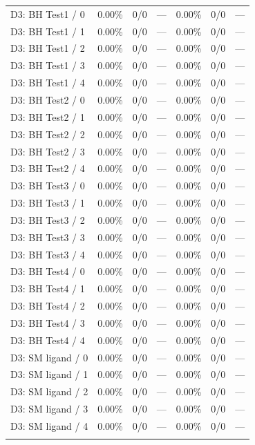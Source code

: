 \begin{longtable}{@{}lrrrrrr@{}}
\addlinespace
D3: BH Test1 / 0 & 0.00\% & 0/0 & --- & 0.00\% & 0/0 & --- \\
D3: BH Test1 / 1 & 0.00\% & 0/0 & --- & 0.00\% & 0/0 & --- \\
D3: BH Test1 / 2 & 0.00\% & 0/0 & --- & 0.00\% & 0/0 & --- \\
D3: BH Test1 / 3 & 0.00\% & 0/0 & --- & 0.00\% & 0/0 & --- \\
D3: BH Test1 / 4 & 0.00\% & 0/0 & --- & 0.00\% & 0/0 & --- \\
\addlinespace
D3: BH Test2 / 0 & 0.00\% & 0/0 & --- & 0.00\% & 0/0 & --- \\
D3: BH Test2 / 1 & 0.00\% & 0/0 & --- & 0.00\% & 0/0 & --- \\
D3: BH Test2 / 2 & 0.00\% & 0/0 & --- & 0.00\% & 0/0 & --- \\
D3: BH Test2 / 3 & 0.00\% & 0/0 & --- & 0.00\% & 0/0 & --- \\
D3: BH Test2 / 4 & 0.00\% & 0/0 & --- & 0.00\% & 0/0 & --- \\
\addlinespace
D3: BH Test3 / 0 & 0.00\% & 0/0 & --- & 0.00\% & 0/0 & --- \\
D3: BH Test3 / 1 & 0.00\% & 0/0 & --- & 0.00\% & 0/0 & --- \\
D3: BH Test3 / 2 & 0.00\% & 0/0 & --- & 0.00\% & 0/0 & --- \\
D3: BH Test3 / 3 & 0.00\% & 0/0 & --- & 0.00\% & 0/0 & --- \\
D3: BH Test3 / 4 & 0.00\% & 0/0 & --- & 0.00\% & 0/0 & --- \\
\addlinespace
D3: BH Test4 / 0 & 0.00\% & 0/0 & --- & 0.00\% & 0/0 & --- \\
D3: BH Test4 / 1 & 0.00\% & 0/0 & --- & 0.00\% & 0/0 & --- \\
D3: BH Test4 / 2 & 0.00\% & 0/0 & --- & 0.00\% & 0/0 & --- \\
D3: BH Test4 / 3 & 0.00\% & 0/0 & --- & 0.00\% & 0/0 & --- \\
D3: BH Test4 / 4 & 0.00\% & 0/0 & --- & 0.00\% & 0/0 & --- \\
\addlinespace
D3: SM ligand / 0 & 0.00\% & 0/0 & --- & 0.00\% & 0/0 & --- \\
D3: SM ligand / 1 & 0.00\% & 0/0 & --- & 0.00\% & 0/0 & --- \\
D3: SM ligand / 2 & 0.00\% & 0/0 & --- & 0.00\% & 0/0 & --- \\
D3: SM ligand / 3 & 0.00\% & 0/0 & --- & 0.00\% & 0/0 & --- \\
D3: SM ligand / 4 & 0.00\% & 0/0 & --- & 0.00\% & 0/0 & --- \\
\addlinespace
\end{longtable}